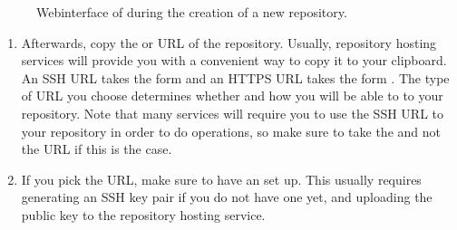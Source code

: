 \begin{figure}[tbp]
\centering
\capstart

\noindent{}
\caption{Webinterface of {\hyperref[\detokenize{glossary:term-GitHub}]{}} during the creation of a new repository.}\label{\detokenize{basics/101-139-hostingservices:id7}}\end{figure}
\begin{enumerate}
%
\item {} 
\sphinxAtStartPar
Afterwards, copy the {\hyperref[\detokenize{glossary:term-SSH}]{}} or {\hyperref[\detokenize{glossary:term-https}]{}} URL of the repository. Usually, repository hosting services will provide you with a convenient way to copy it to your clipboard. An SSH URL takes the form  and an HTTPS URL takes the form . The type of URL you choose determines whether and how you will be able to  to your repository. Note that many services will require you to use the SSH URL to your repository in order to do  operations, so make sure to take the {\hyperref[\detokenize{glossary:term-SSH}]{}} and not the {\hyperref[\detokenize{glossary:term-https}]{}} URL if this is the case.

\item {} 
\sphinxAtStartPar
If you pick the {\hyperref[\detokenize{glossary:term-SSH}]{}} URL, make sure to have an {\hyperref[\detokenize{glossary:term-SSH-key}]{}} set up. This usually requires generating an SSH key pair if you do not have one yet, and uploading the public key to the repository hosting service.

\end{enumerate}

